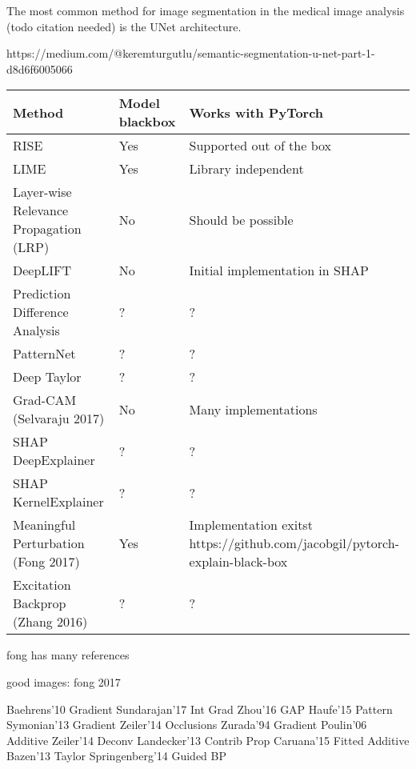 The most common method for image segmentation in the medical image analysis (todo citation needed) is the UNet\cite{todo} architecture.



https://medium.com/@keremturgutlu/semantic-segmentation-u-net-part-1-d8d6f6005066


\begin{tabular}{| p{7cm} | p{2.5cm} | p{6cm} | }
\hline
\textbf{Method} & \textbf{Model blackbox} & \textbf{Works with PyTorch} \\ \hline
RISE\cite{Petsiuk2018rise} & Yes & Supported out of the box \\ \hline
LIME\cite{ribeiro2016should} & Yes & Library independent \\ \hline
Layer-wise Relevance Propagation (LRP) & No & Should be possible  \\ \hline
DeepLIFT & No & Initial implementation in SHAP\cite{NIPS2017_7062} \\ \hline
Prediction Difference Analysis \cite{todo} & ? & ? \\ \hline
PatternNet & ? & ? \\ \hline
Deep Taylor & ? & ? \\ \hline
Grad-CAM (Selvaraju 2017) & No & Many implementations \\ \hline
SHAP DeepExplainer\cite{NIPS2017_7062} & ? & ? \\ \hline
SHAP KernelExplainer\cite{NIPS2017_7062} & ? & ? \\ \hline
Meaningful Perturbation (Fong 2017)\cite{todo} & Yes & Implementation exitst \cite{todo} https://github.com/jacobgil/pytorch-explain-black-box \\ \hline
Excitation Backprop (Zhang 2016)\cite{todo}  & ? & ? \\ \hline
\end{tabular}



fong has many references

good images: fong 2017

Baehrens'10 Gradient
Sundarajan'17 Int Grad
Zhou'16 GAP
Haufe'15 Pattern
Symonian'13 Gradient
Zeiler'14 Occlusions
Zurada'94 Gradient
Poulin'06 Additive
Zeiler'14 Deconv
Landecker'13 Contrib Prop
Caruana'15 Fitted Additive
Bazen'13 Taylor
Springenberg'14 Guided BP


